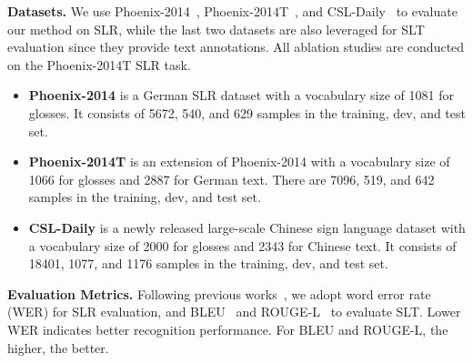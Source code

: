 \documentclass{article}
\begin{document}
\noindent \textbf{Datasets.} We use Phoenix-2014~\cite{P2014}, Phoenix-2014T~\cite{camgoz2018neural}, and CSL-Daily~\cite{zhou2021improving} to evaluate our method on SLR, while the last two datasets are also leveraged for SLT evaluation since they provide text annotations. All ablation studies are conducted on the Phoenix-2014T SLR task. \begin{itemize}[leftmargin=0.33cm]
    \item \textbf{Phoenix-2014} is a German SLR dataset with a vocabulary size of 1081 for glosses. It consists of 5672, 540, and 629 samples in the training, dev, and test set. 
\item \textbf{Phoenix-2014T} is an extension of Phoenix-2014 with a vocabulary size of 1066 for glosses and 2887 for German text. There are 7096, 519, and 642 samples in the training, dev, and test set.
\item \textbf{CSL-Daily} is a newly released large-scale Chinese sign language dataset with a vocabulary size of 2000 for glosses and 2343 for Chinese text. It consists of 18401, 1077, and 1176 samples in the training, dev, and test set.
\end{itemize}
\textbf{Evaluation Metrics.} Following previous works~\cite{STMC_MM, MMTLB_2022, camgoz2020sign, camgoz2018neural, zhou2021improving}, we adopt word error rate (WER) for SLR evaluation, and BLEU~\cite{papineni2002bleu} and ROUGE-L~\cite{lin2004rouge} to evaluate SLT. Lower WER indicates better recognition performance. For BLEU and ROUGE-L, the higher, the better. 
\end{document}
